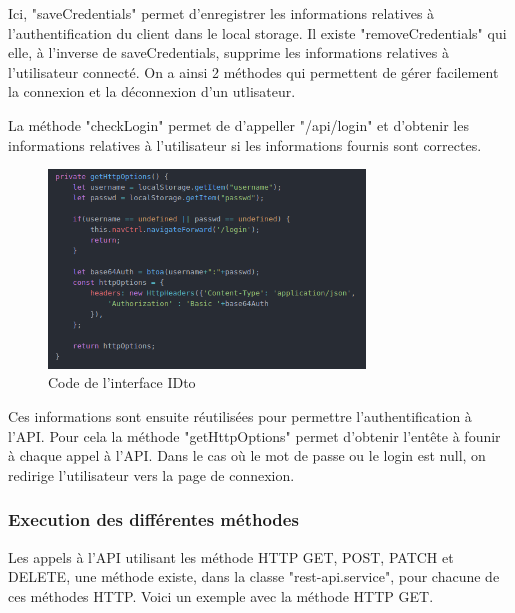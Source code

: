 				Ici, "saveCredentials" permet d'enregistrer les informations relatives à l'authentification du client dans le local storage. Il existe "removeCredentials" qui elle, à l'inverse de saveCredentials, supprime les informations relatives à l'utilisateur connecté. On a ainsi 2 méthodes qui permettent de gérer facilement la connexion et la déconnexion d'un utlisateur.

  				La méthode "checkLogin" permet de d'appeller "/api/login" et d'obtenir les informations relatives à l'utilisateur si les informations fournis sont correctes.

				\begin{figure}[H]
					\centering\includegraphics[width=0.75\textwidth, keepaspectratio]{res/ionic-rest-httpoptions.png}
					\caption{Code de l'interface IDto}
				\end{figure}

				Ces informations sont ensuite réutilisées pour permettre l'authentification à l'API. Pour cela la méthode "getHttpOptions" permet d'obtenir l'entête à founir à chaque appel à l'API. Dans le cas où le mot de passe ou le login est null, on redirige l'utilisateur vers la page de connexion.

			\subsubsection{Execution des différentes méthodes}

				Les appels à l'API utilisant les méthode HTTP GET, POST, PATCH et DELETE, une méthode existe, dans la classe "rest-api.service", pour chacune de ces méthodes HTTP. Voici un exemple avec la méthode HTTP GET.

